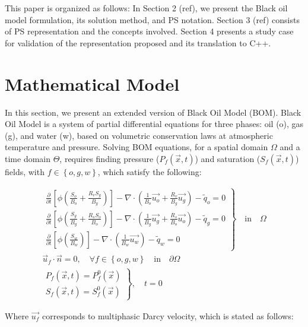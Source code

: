 \documentclass[review]{elsarticle}
\begin{document}
This paper is organized as follows: In Section 2 (ref), we present the Black oil model formulation, its solution method, and PS notation. Section 3 (ref) consists of PS representation and the concepts involved. Section 4 presents a study case for validation of the representation proposed and its translation to C++.

\section{Mathematical Model}
In this section, we present an extended version of Black Oil Model (BOM). Black Oil Model is a system of partial differential equations for three phases: oil (o), gas (g), and water (w), based on volumetric conservation laws at atmospheric temperature and pressure. Solving BOM equations, for a spatial domain $\Omega$ and a time domain $\Theta$, requires finding pressure ($P_{f}(\vec{x},t)$) and saturation ($S_{f}(\vec{x},t)$) fields, with $f \in \left\lbrace o,g,w\right\rbrace $, which satisfy the following:

\begin{align*}
\left.
\begin{array}{l}
\frac{\partial}{\partial t} \left[ \phi \left( \frac{S_{o}}{B_{o}} + \frac{R_{v} S_{g}}{B_{g}} \right) \right]
- \nabla \cdot \left( \frac{1}{B_{o}} \vec{u_{o}} + \frac{R_{v}}{B_{g}} \vec{u_{g}} \right) - \tilde{q}_{o}=0  \\
\frac{\partial}{\partial t} \left[ \phi \left( \frac{S_{g}}{B_{g}} + \frac{R_{s} S_{o}}{B_{o}} \right) \right]
- \nabla \cdot \left( \frac{1}{B_{g}} \vec{u_{g}} + \frac{R_{s}}{B_{o}} \vec{u_{o}} \right) - \tilde{q}_{g} = 0\\
\frac{\partial}{\partial t} \left[\phi \left( \frac{S_{w}}{B_{w}} \right) \right] - \nabla \cdot \left( \frac{1}{B_{w}} \vec{u_{w}} \right) - \tilde{q}_{w} = 0
\end{array}
\right \rbrace  \quad \text{in} \quad \Omega\\
\vec{u}_{f} \cdot \vec{n} = 0, \quad \forall f \in \left\lbrace o,g,w\right\rbrace \quad \text{in} \quad \partial \Omega \\
\left.
\begin{array}{l}
P_{f}(\vec{x},t) = P^{0}_{f}(\vec{x})  \\
S_{f}(\vec{x},t) = S^{0}_{f}(\vec{x})\end{array}
\right \rbrace , \quad t=0
\end{align*}

Where $\vec{u_{f}}$ corresponds to multiphasic Darcy velocity, which is stated as follows: 
\end{document}
